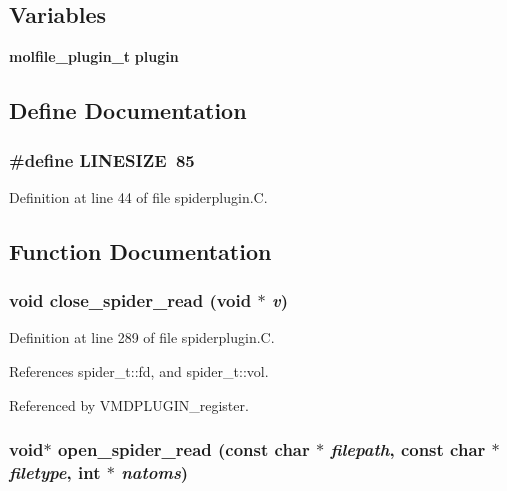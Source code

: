 \subsection*{Variables}
\begin{CompactItemize}
\item 
{\bf molfile\_\-plugin\_\-t} {\bf plugin}
\end{CompactItemize}


\subsection{Define Documentation}
\subsubsection{\setlength{\rightskip}{0pt plus 5cm}\#define LINESIZE\ 85}\label{spiderplugin_8C_a0}




Definition at line 44 of file spiderplugin.C.

\subsection{Function Documentation}
\subsubsection{\setlength{\rightskip}{0pt plus 5cm}void close\_\-spider\_\-read (void $\ast$ {\em v})\hspace{0.3cm}{\tt  [static]}}\label{spiderplugin_8C_a5}




Definition at line 289 of file spiderplugin.C.

References spider\_\-t::fd, and spider\_\-t::vol.

Referenced by VMDPLUGIN\_\-register.
\subsubsection{\setlength{\rightskip}{0pt plus 5cm}void$\ast$ open\_\-spider\_\-read (const char $\ast$ {\em filepath}, const char $\ast$ {\em filetype}, int $\ast$ {\em natoms})\hspace{0.3cm}{\tt  [static]}}\label{spiderplugin_8C_a2}




